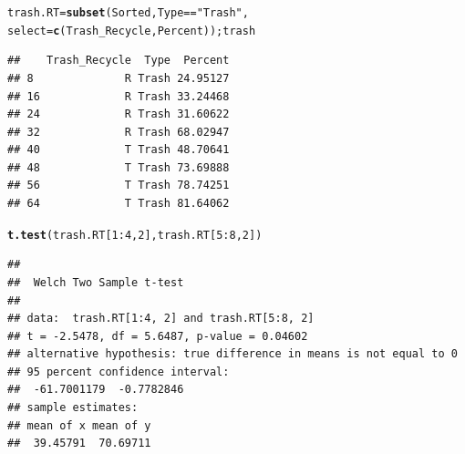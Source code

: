 \documentclass{tufte-handout}\usepackage[]{graphicx}\usepackage[]{color}
\makeatletter
\newcommand{\hlnum}[1]{\textcolor[rgb]{0.686,0.059,0.569}{#1}}%
\newcommand{\hlstr}[1]{\textcolor[rgb]{0.192,0.494,0.8}{#1}}%
\newcommand{\hlopt}[1]{\textcolor[rgb]{0,0,0}{#1}}%
\newcommand{\hlstd}[1]{\textcolor[rgb]{0.345,0.345,0.345}{#1}}%
\newcommand{\hlkwb}[1]{\textcolor[rgb]{0.69,0.353,0.396}{#1}}%
\newcommand{\hlkwc}[1]{\textcolor[rgb]{0.333,0.667,0.333}{#1}}%
\newcommand{\hlkwd}[1]{\textcolor[rgb]{0.737,0.353,0.396}{\textbf{#1}}}%
\newenvironment{kframe}{%
 \def\at@end@of@kframe{}%
 \ifinner\ifhmode%
  \def\at@end@of@kframe{\end{minipage}}%
  \begin{minipage}{\columnwidth}%
 \fi\fi%
 \def\FrameCommand##1{\hskip\@totalleftmargin \hskip-\fboxsep
 \colorbox{shadecolor}{##1}\hskip-\fboxsep
     \hskip-\linewidth \hskip-\@totalleftmargin \hskip\columnwidth}%
 \MakeFramed {\advance\hsize-\width
   \@totalleftmargin\z@ \linewidth\hsize
   \@setminipage}}%
 {\par\unskip\endMakeFramed%
 \at@end@of@kframe}
\newenvironment{knitrout}{}{} %
\makeatother
\begin{document}
\begin{knitrout}
\color{fgcolor}\begin{kframe}
\begin{alltt}
\hlstd{trash.RT} \hlkwb{=} \hlkwd{subset}\hlstd{(Sorted, Type} \hlopt{==} \hlstr{"Trash"}\hlstd{,}
            \hlkwc{select} \hlstd{=} \hlkwd{c}\hlstd{(Trash_Recycle, Percent)); trash}
\end{alltt}
\begin{verbatim}
##    Trash_Recycle  Type  Percent
## 8              R Trash 24.95127
## 16             R Trash 33.24468
## 24             R Trash 31.60622
## 32             R Trash 68.02947
## 40             T Trash 48.70641
## 48             T Trash 73.69888
## 56             T Trash 78.74251
## 64             T Trash 81.64062
\end{verbatim}
\begin{alltt}
\hlkwd{t.test}\hlstd{(trash.RT[}\hlnum{1}\hlopt{:}\hlnum{4}\hlstd{,}\hlnum{2}\hlstd{], trash.RT[}\hlnum{5}\hlopt{:}\hlnum{8}\hlstd{,}\hlnum{2}\hlstd{])}
\end{alltt}
\begin{verbatim}
## 
## 	Welch Two Sample t-test
## 
## data:  trash.RT[1:4, 2] and trash.RT[5:8, 2]
## t = -2.5478, df = 5.6487, p-value = 0.04602
## alternative hypothesis: true difference in means is not equal to 0
## 95 percent confidence interval:
##  -61.7001179  -0.7782846
## sample estimates:
## mean of x mean of y 
##  39.45791  70.69711
\end{verbatim}
\end{kframe}
\end{knitrout}
\end{document}
